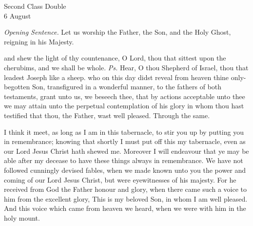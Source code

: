 \begin{inhead}
    {Second Class Double\\
6 August}
\end{inhead}
\par\noindent
\textit{Opening Sentence.} Let us worship the Father, the Son, and the Holy Ghost, reigning in his Majesty.%

\introit
{} and shew the light of thy countenance, O Lord, thou that sittest upon the cherubims, and we shall be whole. \textit{Ps.} Hear, O thou Shepherd of Israel, thou that leadest Joseph like a sheep.
\collect
 who on this day didst reveal from heaven thine only-begotten Son, transfigured in a wonderful manner, to the fathers of both testaments, grant unto us, we beseech thee, that by actions acceptable unto thee we may attain unto the perpetual contemplation of his glory in whom thou hast testified that thou, the Father, wast well pleased. Through the same.

 I think it meet, as long as I am in this tabernacle, to stir you up by putting you in remembrance; knowing that shortly I must put off this my tabernacle, even as our Lord Jesus Christ hath shewed me. Moreover I will endeavour that ye may be able after my decease to have these things always in remembrance. We have not followed cunningly devised fables, when we made known unto you the power and coming of our Lord Jesus Christ, but were eyewitnesses of his majesty. For he received from God the Father honour and glory, when there came such a voice to him from the excellent glory, This is my beloved Son, in whom I am well pleased. And this voice which came from heaven we heard, when we were with him in the holy mount.


